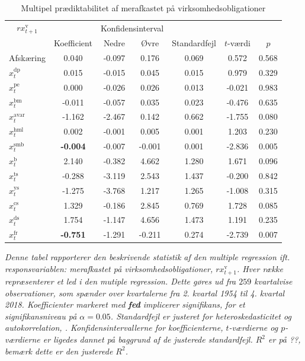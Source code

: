 \documentclass[
  a4paper,
  oneside]{memoir}
\begin{document}
\begin{table}[H]

\caption{\label{tab:MULT-v}Multipel prædiktabilitet af merafkastet på virksomhedsobligationer}
\centering
\begin{threeparttable}
\begin{tabular}[t]{lcccccc}
\toprule
\multicolumn{1}{c}{$rx_{t+1}^{\text{v}}$} & \multicolumn{1}{c}{ } & \multicolumn{2}{c}{Konfidensinterval} & \multicolumn{3}{c}{ } \\
\cmidrule(l{3pt}r{3pt}){1-1} \cmidrule(l{3pt}r{3pt}){3-4}
  & Koefficient & Nedre & Øvre & Standardfejl & $t$-værdi & $p$\\
\midrule
\rowcolor{gray!6}  Afskæring & 0.040 & -0.097 & 0.176 & 0.069 & 0.572 & 0.568\\
$x_t^{\text{dp}}$ & 0.015 & -0.015 & 0.045 & 0.015 & 0.979 & 0.329\\
\rowcolor{gray!6}  $x_t^{\text{pe}}$ & 0.000 & -0.026 & 0.026 & 0.013 & -0.021 & 0.983\\
$x_t^{\text{bm}}$ & -0.011 & -0.057 & 0.035 & 0.023 & -0.476 & 0.635\\
\rowcolor{gray!6}  $x_t^{\text{avar}}$ & -1.162 & -2.467 & 0.142 & 0.662 & -1.755 & 0.080\\
$x_t^{\text{hml}}$ & 0.002 & -0.001 & 0.005 & 0.001 & 1.203 & 0.230\\
\rowcolor{gray!6}  $x_t^{\text{smb}}$ & \textbf{-0.004} & -0.007 & -0.001 & 0.001 & -2.836 & 0.005\\
$x_t^{\text{b}}$ & 2.140 & -0.382 & 4.662 & 1.280 & 1.671 & 0.096\\
\rowcolor{gray!6}  $x_t^{\text{ts}}$ & -0.288 & -3.119 & 2.543 & 1.437 & -0.200 & 0.842\\
$x_t^{\text{ys}}$ & -1.275 & -3.768 & 1.217 & 1.265 & -1.008 & 0.315\\
\rowcolor{gray!6}  $x_t^{\text{cs}}$ & 1.329 & -0.186 & 2.845 & 0.769 & 1.728 & 0.085\\
$x_t^{\text{ds}}$ & 1.754 & -1.147 & 4.656 & 1.473 & 1.191 & 0.235\\
\rowcolor{gray!6}  $x_t^{\text{fr}}$ & \textbf{-0.751} & -1.291 & -0.211 & 0.274 & -2.739 & 0.007\\
\bottomrule
\end{tabular}
\begin{tablenotes}
\item \textit{Denne tabel rapporterer den beskrivende statistik af den multiple regression ift. responsvariablen: merafkastet på virksomhedsobligationer, $rx_{t+1}^{\text{v}}$. Hver række repræsenterer et led i den mutiple regression. Dette gøres ud fra $259$ kvartalvise observationer, som spænder over kvartalerne fra 2. kvartal 1954 til 4. kvartal 2018. Koefficienter markeret med \textbf{fed} implicerer signifikans, for et signifikansniveau på $\alpha=0.05$. Standardfejl er justeret for heteroskedasticitet og autokorrelation, \citep{Newey1987}. Konfidensintervallerne for koefficienterne, $t$-værdierne og $p$-værdierne er ligedes dannet på baggrund af de justerede standardfejl. $R^2$ er på ??, bemærk dette er den justerede $R^2$.}
\end{tablenotes}
\end{threeparttable}
\end{table}
\end{document}
